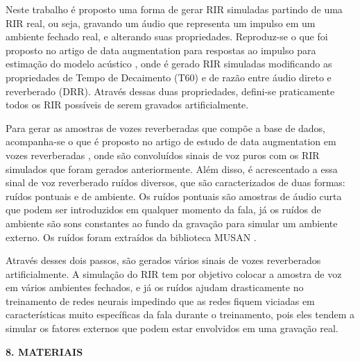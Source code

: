 \documentclass[a4paper,12pt,oneside,openany]{report}
\begin{document}
Neste trabalho é proposto uma forma de gerar RIR simuladas partindo de uma RIR real, ou seja, gravando um áudio que representa um impulso em um ambiente
fechado real, e alterando suas propriedades. Reproduz-se o que foi proposto no artigo de data augmentation para respostas ao impulso para
estimação do modelo acústico \cite{RIR_Data_Aug}, onde é gerado RIR simuladas modificando as propriedades de Tempo de Decaimento (T60) e de
razão entre áudio direto e reverberado (DRR). Através dessas duas propriedades, defini-se praticamente todos os RIR possíveis de serem gravados
artificialmente.

Para gerar as amostras de vozes reverberadas que compõe a base de dados, acompanha-se o que é proposto no artigo de estudo de data
augmentation em vozes reverberadas \cite{Speech_Rec}, onde são convoluídos sinais de voz puros com os RIR simulados que foram gerados anteriormente.
Além disso, é acrescentado a essa sinal de voz reverberado ruídos diversos, que são caracterizados de duas formas: ruídos pontuais e de ambiente.
Os ruídos pontuais são amostras de áudio curta que podem ser introduzidos em qualquer momento da fala, já os ruídos de ambiente são sons constantes
ao fundo da gravação para simular um ambiente externo. Os ruídos foram extraídos da biblioteca MUSAN \cite{noiseLib}.

Através desses dois passos, são gerados vários sinais de vozes reverberados artificialmente. A simulação do RIR tem por objetivo colocar
a amostra de voz em vários ambientes fechados, e já os ruídos ajudam drasticamente no treinamento de redes neurais impedindo que as redes fiquem
viciadas em características muito específicas da fala durante o treinamento, pois eles tendem a simular os fatores externos que podem estar envolvidos em uma
gravação real.

\pagebreak
\textbf{8. MATERIAIS}
\end{document}
